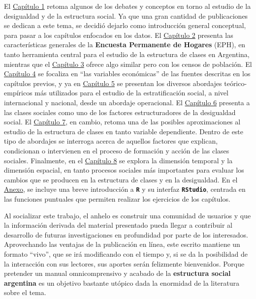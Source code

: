 \documentclass[
]{article}
\begin{document}
El \protect\hyperlink{analisis1}{Capítulo 1} retoma algunos de los debates y conceptos en torno al estudio de la desigualdad y de la estructura social. Ya que una gran cantidad de publicaciones se dedican a este tema, se decidió dejarlo como introducción general conceptual, para pasar a los capítulos enfocados en los datos. El \protect\hyperlink{fuentes}{Capítulo 2} presenta las características generales de la \textbf{Encuesta Permanente de Hogares} (EPH), en tanto herramienta central para el estudio de la estructura de clases en Argentina, mientras que el \protect\hyperlink{fuentes2}{Capítulo 3} ofrece algo similar pero con los censos de población. El \protect\hyperlink{ocupacion}{Capítulo 4} se focaliza en ``las variables económicas'' de las fuentes descritas en los capítulos previos, y ya en \protect\hyperlink{clases5}{Capítulo 5} se presentan los diversos abordajes teórico-empíricos más utilizados para el estudio de la estratificación social, a nivel internacional y nacional, desde un abordaje operacional. El \protect\hyperlink{independiente}{Capítulo 6} presenta a las clases sociales como uno de los factores estructuradores de la desigualdad social. El \protect\hyperlink{dependiente}{Capítulo 7}, en cambio, retoma una de las posibles aproximaciones al estudio de la estructura de clases en tanto variable dependiente. Dentro de este tipo de abordajes se interroga acerca de aquellos factores que explican, condicionan o intervienen en el proceso de formación y acción de las clases sociales. Finalmente, en el \protect\hyperlink{tiempo}{Capítulo 8} se explora la dimensión temporal y la dimensión espacial, en tanto procesos sociales más importantes para evaluar los cambios que se producen en la estructura de clases y en la desigualdad. En el \protect\hyperlink{anexo}{Anexo}, se incluye una breve introducción a \textbf{\texttt{R}} y su interfaz \textbf{\texttt{RStudio}}, centrada en las funciones puntuales que permiten realizar los ejercicios de los capítulos.

Al socializar este trabajo, el anhelo es construir una comunidad de usuarios y que la información derivada del material presentado pueda llegar a contribuir al desarrollo de futuras investigaciones en profundidad por parte de los interesados. Aprovechando las ventajas de la publicación en línea, este escrito mantiene un formato ``vivo'', que se irá modificando con el tiempo y, si se da la posibilidad de la interacción con sus lectores, sus aportes serán felizmente bienvenidos. Porque pretender un manual omnicomprensivo y acabado de la \textbf{estructura social argentina} es un objetivo bastante utópico dada la enormidad de la literatura sobre el tema.
\end{document}

